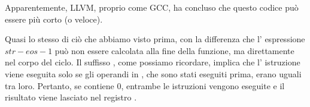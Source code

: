 Apparentemente, LLVM, proprio come GCC, ha concluso che questo codice può essere più corto (o veloce).

\mysubparagraph{\OptimizingKeilVI (\ARMMode)}




Quasi lo stesso di ciò che abbiamo visto prima, con la differenza che l' espressione $str - eos - 1$ 
può non essere calcolata alla fine della funzione, ma direttamente nel corpo del ciclo.
Il suffisso , come possiamo ricordare, implica che l' istruzione viene eseguita solo se gli operandi in
 \CMP, che sono stati eseguiti prima, erano uguali tra loro.
Pertanto, se  contiene 0, entrambe le istruzioni  vengono eseguite e il risultato viene lasciato nel registro .

